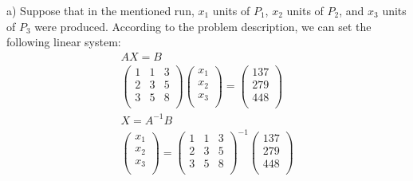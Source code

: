 \documentclass{article}
\begin{document}
a) 
Suppose that in the mentioned run, $x_1$ units of $P_1$, $x_2$ units of $P_2$, 
and $x_3$ units of $P_3$ were produced. According to the problem description, we 
can set the following linear system:
\begin{gather*}
  AX = B \\
  \begin{pmatrix}
    1 & 1 & 3 \\
    2 & 3 & 5 \\
    3 & 5 & 8 \\
  \end{pmatrix}
  \begin{pmatrix}
    x_1 \\
    x_2 \\
    x_3 \\
  \end{pmatrix} = 
  \begin{pmatrix}
    137 \\
    279 \\
    448 \\
  \end{pmatrix} \\
  X = A^{-1}B \\
  \begin{pmatrix}
    x_1 \\
    x_2 \\
    x_3 \\
  \end{pmatrix} = 
  \begin{pmatrix}
    1 & 1 & 3 \\
    2 & 3 & 5 \\
    3 & 5 & 8 \\
  \end{pmatrix}^{-1}
  \begin{pmatrix}
    137 \\
    279 \\
    448 \\
  \end{pmatrix} \\
\end{gather*}
\end{document}
